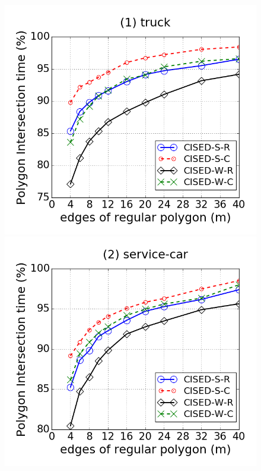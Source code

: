 \begin{figure}[tb!]
\centering
\includegraphics[scale = 0.240]{Figures/Exp-M-poly-time-ratio-truck.png}
\includegraphics[scale = 0.240]{Figures/Exp-M-poly-time-ratio-service.png}

\end{figure}
